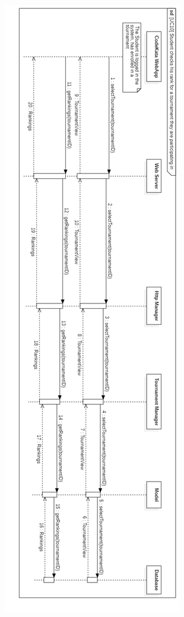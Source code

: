 \documentclass{article}
\begin{document}
\newpage
\begin{center}
    \includegraphics[angle=-90,width=0.37\linewidth]{uc10.jpg}
  \label{fig:uc10}
\end{center}
\end{document}
